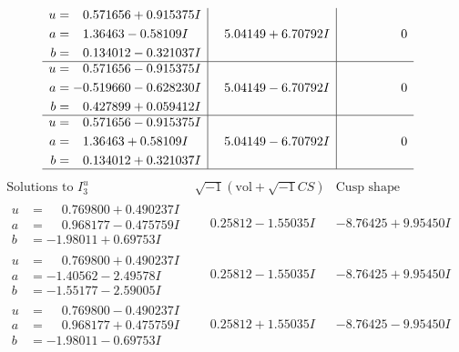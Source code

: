 \documentclass[1p]{elsarticle_modified}
\theoremstyle{definition}
\newcommand{\I}{\sqrt{-1}}
\begin{document}
$$\begin{array}{c|c|c}
\begin{aligned}
u &= \phantom{-}0.571656 + 0.915375 I \\
a &= \phantom{-}1.36463 - 0.58109 I \\
b &= \phantom{-}0.134012 - 0.321037 I\end{aligned}
 & \phantom{-}5.04149 + 6.70792 I & \phantom{-0.000000 } 0 \\ \hline\begin{aligned}
u &= \phantom{-}0.571656 - 0.915375 I \\
a &= -0.519660 - 0.628230 I \\
b &= \phantom{-}0.427899 + 0.059412 I\end{aligned}
 & \phantom{-}5.04149 - 6.70792 I & \phantom{-0.000000 } 0 \\ \hline\begin{aligned}
u &= \phantom{-}0.571656 - 0.915375 I \\
a &= \phantom{-}1.36463 + 0.58109 I \\
b &= \phantom{-}0.134012 + 0.321037 I\end{aligned}
 & \phantom{-}5.04149 - 6.70792 I & \phantom{-0.000000 } 0\\
 \hline 
 \end{array}$$\newpage$$\begin{array}{c|c|c}  
\text{Solutions to }I^u_{3}& \I (\text{vol} + \sqrt{-1}CS) & \text{Cusp shape}\\
 \hline 
\begin{aligned}
u &= \phantom{-}0.769800 + 0.490237 I \\
a &= \phantom{-}0.968177 - 0.475759 I \\
b &= -1.98011 + 0.69753 I\end{aligned}
 & \phantom{-}0.25812 - 1.55035 I & -8.76425 + 9.95450 I \\ \hline\begin{aligned}
u &= \phantom{-}0.769800 + 0.490237 I \\
a &= -1.40562 - 2.49578 I \\
b &= -1.55177 - 2.59005 I\end{aligned}
 & \phantom{-}0.25812 - 1.55035 I & -8.76425 + 9.95450 I \\ \hline\begin{aligned}
u &= \phantom{-}0.769800 - 0.490237 I \\
a &= \phantom{-}0.968177 + 0.475759 I \\
b &= -1.98011 - 0.69753 I\end{aligned}
 & \phantom{-}0.25812 + 1.55035 I & -8.76425 - 9.95450 I \\ \hline\begin{aligned}

\end{aligned}
\end{array}$$
\end{document}
